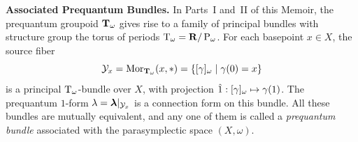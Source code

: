 \begin{article}
    \medskip
    \noindent
    \textbf{Associated Pre\-quantum Bundles.}
    In Parts~I and~II of this Memoir,
    the prequantum groupoid ${\mathbf T}_\omega$ gives rise to a family of principal bundles
    with structure group the torus of periods $\mathrm{T}_\omega = {\mathbf{R}}/\operatorname{P}_\omega$.
    For each basepoint $x \in X$,
    the source fiber
    \[
      \mathcal{Y}_x = {\operatorname{Mor}}_{{\mathbf T}_\omega}(x,\ast) = \{ [\gamma]_\omega \mid \gamma(0) = x \}
      \]
    is a principal $\mathrm{T}_\omega$-bundle over $X$,
    with projection $\hat 1: [\gamma]_\omega \mapsto \gamma(1)$.
    The prequantum $1$-form $\lambda = \boldsymbol \lambda|_{\mathcal{Y}_x}$ is a connection form
    on this bundle.
    All these bundles are mutually equivalent,
    and any one of them is called a \emph{prequantum bundle}
    associated with the parasymplectic space $(X,\omega)$.
  \end{article}
  
